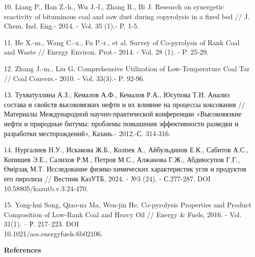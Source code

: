 \begin{references}
10. Liang P., Han Z.-h., Wu J.-f., Zhang R., Bi J. Research on
synergetic reactivity of bituminous coal and saw dust during copyrolysis
in a fixed bed // J. Chem. Ind. Eng.- 2014. - Vol. 35 (1).- P. 1-5.

11. He X.-m., Wang C.-x., Fu P.-r., et al. Survey of Co-pyrolysis of
Rank Coal and Waste // Energy Environ. Prot.- 2014. - Vol. 28 (1). - P.
25-29.

12. Zhang J.-m., Liu G. Comprehensive Utilization of Low-Temperature
Coal Tar // Coal Convers.- 2010. - Vol. 33(3).- P. 92-96.

13. Тухватуллина А.З., Кемалов А.Ф., Кемалов Р.А., Юсупова Т.Н. Анализ
состава и свойств высоковязких нефти и их влияние на процессы коксования
// Материалы Международной научно-практической конференции «Высоковязкие
нефти и природные битумы: проблемы повышения эффективности разведки и
разработки месторождений», Казань.- 2012.-С. 314-316.

14. Нургалиев Н.У., Искакова Ж.Б., Колпек А., Айбульдинов Е.К., Сабитов
А.С., Копишев Э.Е., Салихов Р.М., Петров М.С., Алжанова Г.Ж., Абдиюсупов
Г.Г., Өмірзақ М.Т. Исследование физико-химических характеристик угля и
продуктов его пиролиза // Вестник КазУТБ, 2024. - №3 (24). - С.277-287.
DOI 10.58805/kazutb.v.3.24-470.

15. Yong-hui Song, Qiao-na Ma, Wen-jin He. Co-pyrolysis Properties and
Product Composition of Low-Rank Coal and Heavy Oil // Energy \& Fuels,
2016. - Vol. 31(1). -- Р. 217--223. DOI
\\10.1021/acs.energyfuels.6b02106.
\end{references}

\begin{center}
{\bfseries References}
\end{center}

